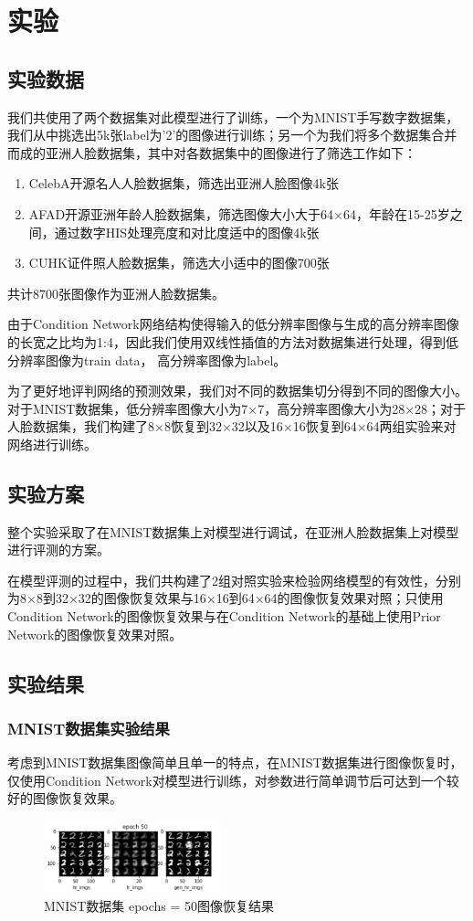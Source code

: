 \section{实验}
\subsection{实验数据}
我们共使用了两个数据集对此模型进行了训练，一个为MNIST手写数字数据集，我们从中挑选出5k张label为'2'的图像进行训练；另一个为我们将多个数据集合并而成的亚洲人脸数据集，其中对各数据集中的图像进行了筛选工作如下：
\begin{enumerate}
\item CelebA开源名人人脸数据集\cite{liu2015deep}，筛选出亚洲人脸图像4k张
\item AFAD开源亚洲年龄人脸数据集\cite{niu2016ordinal}，筛选图像大小大于64×64，年龄在15-25岁之间，通过数字HIS处理亮度和对比度适中的图像4k张
\item CUHK证件照人脸数据集\cite{wang2008face}，筛选大小适中的图像700张
\end{enumerate}
共计8700张图像作为亚洲人脸数据集。

由于Condition Network网络结构使得输入的低分辨率图像与生成的高分辨率图像的长宽之比均为1:4，因此我们使用双线性插值的方法对数据集进行处理，得到低分辨率图像为train data， 高分辨率图像为label。

为了更好地评判网络的预测效果，我们对不同的数据集切分得到不同的图像大小。对于MNIST数据集，低分辨率图像大小为7×7，高分辨率图像大小为28×28；对于人脸数据集，我们构建了8×8恢复到32×32以及16×16恢复到64×64两组实验来对网络进行训练。

\subsection{实验方案}
整个实验采取了在MNIST数据集上对模型进行调试，在亚洲人脸数据集上对模型进行评测的方案。

在模型评测的过程中，我们共构建了2组对照实验来检验网络模型的有效性，分别为8×8到32×32的图像恢复效果与16×16到64×64的图像恢复效果对照；只使用Condition Network的图像恢复效果与在Condition Network的基础上使用Prior Network的图像恢复效果对照。

\subsection{实验结果}
\subsubsection{MNIST数据集实验结果}
考虑到MNIST数据集图像简单且单一的特点，在MNIST数据集进行图像恢复时，仅使用Condition Network对模型进行训练，对参数进行简单调节后可达到一个较好的图像恢复效果。
\begin{figure}[htp]
    \centering
    \includegraphics[width=0.46\textwidth]{figures/MNIST_all_epoch50}
    \caption{MNIST数据集 epochs = 50图像恢复结果}
    \label{MNIST_all_epoch50}
\end{figure}


